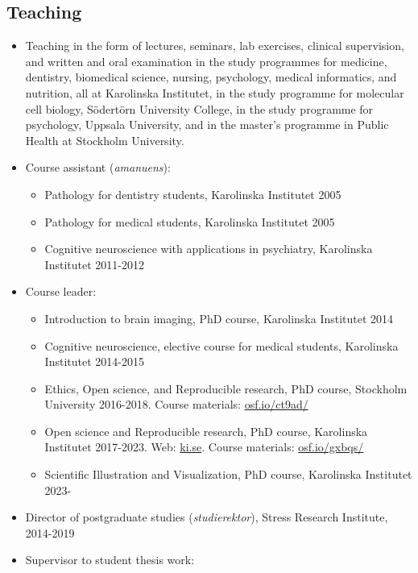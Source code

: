 \documentclass[10pt]{article}
\begin{document}
\subsection*{Teaching}
\begin{itemize}[nolistsep]
\item Teaching in the form of lectures, seminars, lab exercises, clinical supervision, and written and oral examination in the study programmes for medicine, dentistry, biomedical science, nursing, psychology, medical informatics, and nutrition, all at Karolinska Institutet, in the study programme for molecular cell biology, Södertörn University College, in the study programme for psychology, Uppsala University, and in the master's programme in Public Health at Stockholm University.
\item Course assistant (\emph{amanuens}):
	\begin{itemize}[nolistsep]
      \item Pathology for dentistry students, Karolinska Institutet 2005
	\item Pathology for medical students, Karolinska Institutet 2005
	\item Cognitive neuroscience with applications in psychiatry, Karolinska Institutet 2011-2012
	\end{itemize}
\item Course leader:
	\begin{itemize}[nolistsep]
      \item Introduction to brain imaging, PhD course, Karolinska Institutet 2014
	\item Cognitive neuroscience, elective course for medical students, Karolinska Institutet 2014-2015
	\item Ethics, Open science, and Reproducible research, PhD course, Stockholm University 2016-2018. Course materials: \href{https://osf.io/ct9ad/}{osf.io/ct9ad/}
	\item Open science and Reproducible research, PhD course, Karolinska Institutet 2017-2023. Web: \href{http://kiwas.ki.se/katalog/katalog/kurs/2692}{ki.se}. Course materials: \href{https://osf.io/gxbqs/}{osf.io/gxbqs/}
	\item Scientific Illustration and Visualization, PhD course, Karolinska Institutet 2023-
	\end{itemize}
\item Director of postgraduate studies (\emph{studierektor}), Stress Research Institute, 2014-2019
\item Supervisor to student thesis work: 

\end{itemize}
\end{document}
